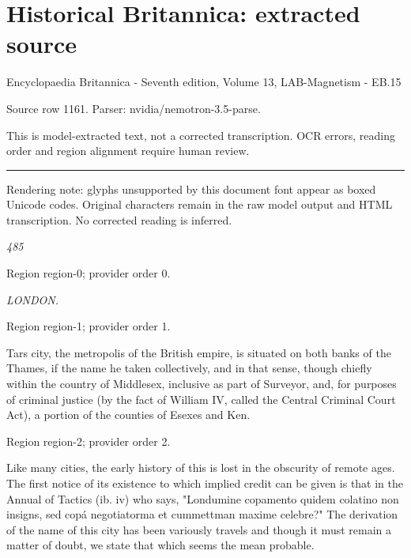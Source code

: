 \documentclass[11pt]{article}
\begin{document}
\section*{Historical Britannica: extracted source}
Encyclopaedia Britannica - Seventh edition, Volume 13, LAB-Magnetism - EB.15\par
{\small Source row 1161. Parser: nvidia/nemotron-3.5-parse.\par}
{\small This is model-extracted text, not a corrected transcription. OCR errors, reading order and region alignment require human review.\par}
\hrule\medskip
{\small\color{red} Rendering note: glyphs unsupported by this document font appear as boxed Unicode codes. Original characters remain in the raw model output and HTML transcription. No corrected reading is inferred.\par}

{\small\itshape 485\par}

{\scriptsize\color{gray} Region region-0; provider order 0.\par}
\medskip

{\small\itshape LONDON.\par}

{\scriptsize\color{gray} Region region-1; provider order 1.\par}
\medskip

Tars city, the metropolis of the British empire, is situated on both banks of the Thames, if the name he taken collectively, and in that sense, though chiefly within the country of Middlesex, inclusive as part of Surveyor, and, for purposes of criminal justice (by the fact of William IV, called the Central Criminal Court Act), a portion of the counties of Esexes and Ken.
\par

{\scriptsize\color{gray} Region region-2; provider order 2.\par}
\medskip

Like many cities, the early history of this is lost in the obscurity of remote ages. The first notice of its existence to which implied credit can be given is that in the Annual of Tactics (ib. iv) who says, "Londumine copamento quidem colatino non insigns, sed copá negotiatorma et cummettman maxime celebre?" The derivation of the name of this city has been variously travels and though it must remain a matter of doubt, we state that which seems the mean probable.
\par
\end{document}
